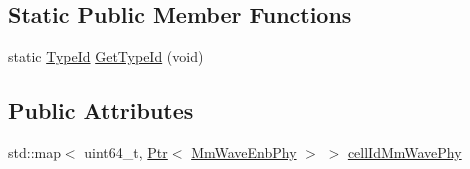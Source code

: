 \subsection*{Static Public Member Functions}
\begin{DoxyCompactItemize}
\item 
static \hyperlink{classns3_1_1TypeId}{Type\+Id} \hyperlink{classns3_1_1EpcUeNas_a01679fd0f5c1576cc95c61e17a54736b}{Get\+Type\+Id} (void)
\end{DoxyCompactItemize}
\subsection*{Public Attributes}
\begin{DoxyCompactItemize}
\item 
std\+::map$<$ uint64\+\_\+t, \hyperlink{classns3_1_1Ptr}{Ptr}$<$ \hyperlink{classns3_1_1MmWaveEnbPhy}{Mm\+Wave\+Enb\+Phy} $>$ $>$ \hyperlink{classns3_1_1EpcUeNas_aea90c088e28cdee40e99e9bc6ef690f2}{cell\+Id\+Mm\+Wave\+Phy}
\end{DoxyCompactItemize}
